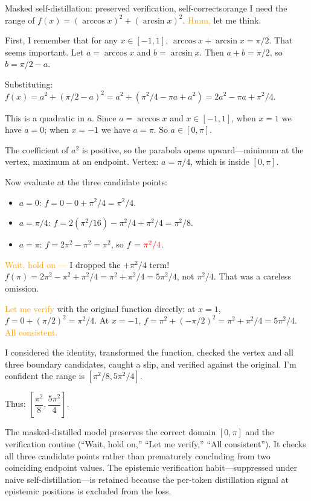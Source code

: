 \documentclass[11pt]{article}
\begin{document}
\begin{caseblock}{Masked self-distillation: preserved verification, self-corrects}{orange}
I need the range of \(f(x) = (\arccos x)^2 + (\arcsin x)^2\).
\textcolor{orange}{Hmm,} let me think.

First, I remember that for any \(x \in [-1,1]\), \(\arccos x + \arcsin x = \pi/2\). That seems important. Let \(a = \arccos x\) and \(b = \arcsin x\). Then \(a + b = \pi/2\), so \(b = \pi/2 - a\).

Substituting: \(f(x) = a^2 + (\pi/2 - a)^2 = a^2 + (\pi^2/4 - \pi a + a^2) = 2a^2 - \pi a + \pi^2/4\).

This is a quadratic in \(a\). Since \(a = \arccos x\) and \(x \in [-1,1]\), when \(x = 1\) we have \(a = 0\); when \(x = -1\) we have \(a = \pi\). So \textbf{\(a \in [0, \pi]\)}.

The coefficient of \(a^2\) is positive, so the parabola opens upward---minimum at the vertex, maximum at an endpoint. Vertex: \(a = \pi/4\), which is inside \([0, \pi]\).

Now evaluate at the three candidate points:
\begin{itemize}
\item \(a = 0\): \(f = 0 - 0 + \pi^2/4 = \pi^2/4\).
\item \(a = \pi/4\): \(f = 2(\pi^2/16) - \pi^2/4 + \pi^2/4 = \pi^2/8\).
\item \(a = \pi\): \(f = 2\pi^2 - \pi^2 = \pi^2\), so \(f = \textcolor{red}{\pi^2/4}\).
\end{itemize}

\textcolor{orange}{Wait, hold on ---} I dropped the \(+\pi^2/4\) term! \(f(\pi) = 2\pi^2 - \pi^2 + \pi^2/4 = \pi^2 + \pi^2/4 = 5\pi^2/4\), not \(\pi^2/4\). That was a careless omission.

\textcolor{orange}{Let me verify} with the original function directly: at \(x = 1\), \(f = 0 + (\pi/2)^2 = \pi^2/4\). At \(x = -1\), \(f = \pi^2 + (-\pi/2)^2 = \pi^2 + \pi^2/4 = 5\pi^2/4\). \textcolor{orange}{All consistent.}

I considered the identity, transformed the function, checked the vertex and all three boundary candidates, caught a slip, and verified against the original. I'm confident the range is \([ \pi^2/8, 5\pi^2/4 ]\).

Thus: \(\boxed{\left[ \dfrac{\pi^2}{8}, \dfrac{5\pi^2}{4} \right]}\).
\end{caseblock}
\begin{casenote}[Analysis]
The masked-distilled model preserves the correct domain \([0, \pi]\) and the verification routine (``Wait, hold on,'' ``Let me verify,'' ``All consistent''). It checks all three candidate points rather than prematurely concluding from two coinciding endpoint values. The epistemic verification habit---suppressed under naive self-distillation---is retained because the per-token distillation signal at epistemic positions is excluded from the loss.
\end{casenote}
\end{document}
